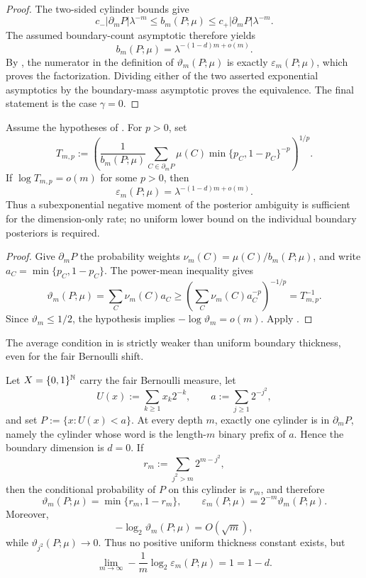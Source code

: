\begin{proof}
The two-sided cylinder bounds give
\[
c_-|\partial_mP|\lambda^{-m}
\le b_m(P;\mu)
\le c_+|\partial_mP|\lambda^{-m}.
\]
The assumed boundary-count asymptotic therefore yields
\[
b_m(P;\mu)=\lambda^{-(1-d)m+o(m)}.
\]
By , the numerator in the definition of
\(\vartheta_m(P;\mu)\) is exactly \(\varepsilon_m(P;\mu)\), which proves the
factorization.  Dividing either of the two asserted exponential asymptotics
by the boundary-mass asymptotic proves the equivalence.  The final statement
is the case \(\gamma=0\).
\end{proof}

\begin{corollary}
\label{cor:lp-average-boundary-thickness}
Assume the hypotheses of .  For
\(p>0\), set
\[
T_{m,p}:=
\left(
\frac{1}{b_m(P;\mu)}
\sum_{C\in\partial_mP}
\mu(C)\min\{p_C,1-p_C\}^{-p}
\right)^{1/p}.
\]
If \(\log T_{m,p}=o(m)\) for some \(p>0\), then
\[
\varepsilon_m(P;\mu)
=\lambda^{-(1-d)m+o(m)}.
\]
Thus a subexponential negative moment of the posterior ambiguity is
sufficient for the dimension-only rate; no uniform lower bound on the
individual boundary posteriors is required.
\end{corollary}

\begin{proof}
Give \(\partial_mP\) the probability weights
\(\nu_m(C)=\mu(C)/b_m(P;\mu)\), and write
\(a_C=\min\{p_C,1-p_C\}\).  The power-mean inequality gives
\[
\vartheta_m(P;\mu)=\sum_C\nu_m(C)a_C
\ge
\left(\sum_C\nu_m(C)a_C^{-p}\right)^{-1/p}
=T_{m,p}^{-1}.
\]
Since \(\vartheta_m\le1/2\), the hypothesis implies
\(-\log\vartheta_m=o(m)\).  Apply
.
\end{proof}

The average condition in  is strictly
weaker than uniform boundary thickness, even for the fair Bernoulli shift.

\begin{example}
\label{ex:square-digit-average-thickness}
Let \(X=\{0,1\}^{\mathbb{N}}\) carry the fair Bernoulli measure, let
\[
U(x):=\sum_{k\ge1}x_k2^{-k},
\qquad
a:=\sum_{j\ge1}2^{-j^2},
\]
and set \(P:=\{x:U(x)<a\}\).  At every depth \(m\), exactly one cylinder is
in \(\partial_mP\), namely the cylinder whose word is the length-\(m\)
binary prefix of \(a\).  Hence the boundary dimension is \(d=0\).  If
\[
r_m:=\sum_{j^2>m}2^{m-j^2},
\]
then the conditional probability of \(P\) on this cylinder is \(r_m\), and
therefore
\[
\vartheta_m(P;\mu)=\min\{r_m,1-r_m\},
\qquad
\varepsilon_m(P;\mu)=2^{-m}\vartheta_m(P;\mu).
\]
Moreover,
\[
-\log_2\vartheta_m(P;\mu)=O(\sqrt m),
\]
while \(\vartheta_{j^2}(P;\mu)\to0\).  Thus no positive uniform thickness
constant exists, but
\[
\lim_{m\to\infty}-\frac1m\log_2\varepsilon_m(P;\mu)=1=1-d.
\]
\end{example}

